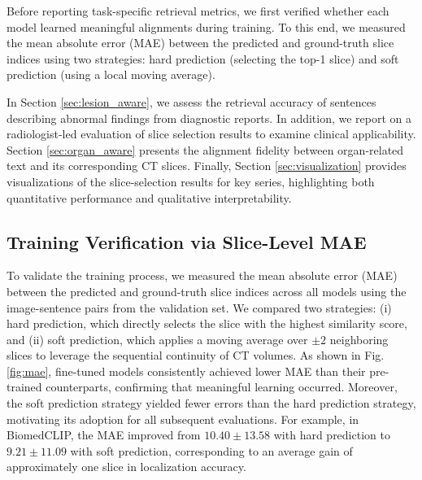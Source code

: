 \documentclass[bioengineering,article,submit,pdftex,moreauthors]{Definitions/mdpi}
\begin{document}
  Before reporting task-specific retrieval metrics, we first verified whether each model learned meaningful alignments during training. To this end, we measured the mean absolute error (MAE) between the predicted and ground-truth slice indices using two strategies: hard prediction (selecting the top-1 slice) and soft prediction (using a local moving average).

In Section \ref{sec:lesion_aware}, we assess the retrieval accuracy of sentences describing abnormal findings from diagnostic reports. 
In addition, we report on a radiologist-led evaluation of slice selection results to examine clinical applicability.
Section \ref{sec:organ_aware} presents the alignment fidelity between organ-related text and its corresponding CT slices. 
Finally, Section \ref{sec:visualization} provides visualizations of the slice-selection results for key series, highlighting both quantitative performance and qualitative interpretability.

\subsection{Training Verification via Slice-Level MAE}

  To validate the training process, we measured the mean absolute error (MAE) between the predicted and ground-truth slice indices across all models using the image-sentence pairs from the validation set. 
  We compared two strategies: (i) hard prediction, which directly selects the slice with the highest similarity score, and (ii) soft prediction, which applies a moving average over $\pm 2$ neighboring slices to leverage the sequential continuity of CT volumes. 
  As shown in Fig. \ref{fig:mae}, fine-tuned models consistently achieved lower MAE than their pre-trained counterparts, confirming that meaningful learning occurred. 
  Moreover, the soft prediction strategy yielded fewer errors than the hard prediction strategy, motivating its adoption for all subsequent evaluations. For example, in BiomedCLIP, the MAE improved from $10.40 \pm 13.58$ with hard prediction to $9.21 \pm 11.09$ with soft prediction, corresponding to an average gain of approximately one slice in localization accuracy.
\end{document}
